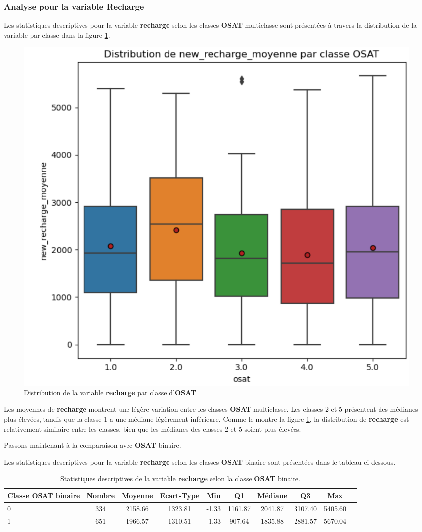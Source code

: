 \subsubsection*{Analyse pour la variable Recharge}
Les statistiques descriptives pour la variable \textbf{recharge} selon les classes \textbf{OSAT} multiclasse sont présentées à travers la distribution de la variable par classe dans la figure \ref{fig:analyse_descriptive_2}.

\begin{figure}[H]
    \centering
    \includegraphics[width=0.7\linewidth]{analyse_descriptive_2.png}
    \caption{Distribution de la variable \textbf{recharge} par classe d'\textbf{OSAT}}
    \label{fig:analyse_descriptive_2}
\end{figure}

Les moyennes de \textbf{recharge} montrent une légère variation entre les classes \textbf{OSAT} multiclasse. Les classes 2 et 5 présentent des médianes plus élevées, tandis que la classe 1 a une médiane légèrement inférieure. Comme le montre la figure \ref{fig:analyse_descriptive_2}, la distribution de \textbf{recharge} est relativement similaire entre les classes, bien que les médianes des classes 2 et 5 soient plus élevées.

Passons maintenant à la comparaison avec \textbf{OSAT} binaire.

Les statistiques descriptives pour la variable \textbf{recharge} selon les classes \textbf{OSAT} binaire sont présentées dans le tableau ci-dessous.

\begin{table}[H]
    \centering
    \begin{tabular}{p{2cm}ccccccccc} %
        \toprule
        Classe OSAT binaire & Nombre & Moyenne & Ecart-Type & Min & Q1 & Médiane & Q3 & Max \\
        \midrule
        0 & 334 & 2158.66 & 1323.81 & -1.33 & 1161.87 & 2041.87 & 3107.40 & 5405.60 \\
        1 & 651 & 1966.57 & 1310.51 & -1.33 & 907.64 & 1835.88 & 2881.57 & 5670.04 \\
        \bottomrule
    \end{tabular}
    \caption{Statistiques descriptives de la variable \textbf{recharge} selon la classe \textbf{OSAT} binaire.}
\end{table}

